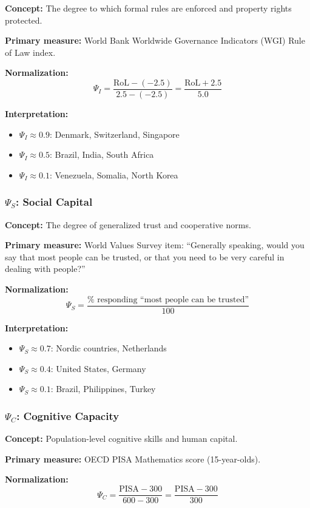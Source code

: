 \textbf{Concept:} The degree to which formal rules are enforced and property 
rights protected.

\textbf{Primary measure:} World Bank Worldwide Governance Indicators (WGI) 
Rule of Law index.

\textbf{Normalization:}
\[
\Psi_I = \frac{\text{RoL} - (-2.5)}{2.5 - (-2.5)} = \frac{\text{RoL} + 2.5}{5.0}
\]

\textbf{Interpretation:}
\begin{itemize}[nosep]
    \item $\Psi_I \approx 0.9$: Denmark, Switzerland, Singapore
    \item $\Psi_I \approx 0.5$: Brazil, India, South Africa
    \item $\Psi_I \approx 0.1$: Venezuela, Somalia, North Korea
\end{itemize}

\subsubsection{$\Psi_S$: Social Capital}

\textbf{Concept:} The degree of generalized trust and cooperative norms.

\textbf{Primary measure:} World Values Survey item: ``Generally speaking, 
would you say that most people can be trusted, or that you need to be very 
careful in dealing with people?''

\textbf{Normalization:}
\[
\Psi_S = \frac{\% \text{ responding ``most people can be trusted''}}{100}
\]

\textbf{Interpretation:}
\begin{itemize}[nosep]
    \item $\Psi_S \approx 0.7$: Nordic countries, Netherlands
    \item $\Psi_S \approx 0.4$: United States, Germany
    \item $\Psi_S \approx 0.1$: Brazil, Philippines, Turkey
\end{itemize}

\subsubsection{$\Psi_C$: Cognitive Capacity}

\textbf{Concept:} Population-level cognitive skills and human capital.

\textbf{Primary measure:} OECD PISA Mathematics score (15-year-olds).

\textbf{Normalization:}
\[
\Psi_C = \frac{\text{PISA} - 300}{600 - 300} = \frac{\text{PISA} - 300}{300}
\]

